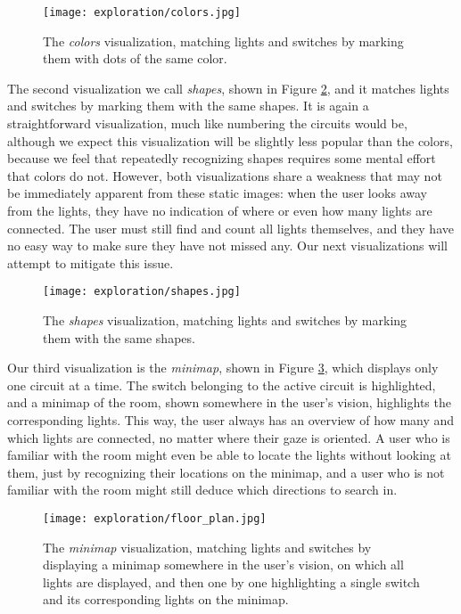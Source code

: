 \begin{figure}
    \centering
    \texttt{[image: exploration/colors.jpg]}
    \caption{The \textit{colors} visualization, matching lights and switches by marking them with dots of the same color.}
    \label{fig:explor:colors_vis}
\end{figure}

The second visualization we call \textit{shapes}, shown in Figure \ref{fig:explor:shapes_vis}, and it matches lights and switches by marking them with the same shapes. It is again a straightforward visualization, much like numbering the circuits would be, although we expect this visualization will be slightly less popular than the colors, because we feel that repeatedly recognizing shapes requires some mental effort that colors do not. However, both visualizations share a weakness that may not be immediately apparent from these static images: when the user looks away from the lights, they have no indication of where or even how many lights are connected. The user must still find and count all lights themselves, and they have no easy way to make sure they have not missed any. Our next visualizations will attempt to mitigate this issue.

\begin{figure}
    \centering
    \texttt{[image: exploration/shapes.jpg]}
    \caption{The \textit{shapes} visualization, matching lights and switches by marking them with the same shapes.}
    \label{fig:explor:shapes_vis}
\end{figure}

Our third visualization is the \textit{minimap}, shown in Figure \ref{fig:explor:floor_plan_vis}, which displays only one circuit at a time. The switch belonging to the active circuit is highlighted, and a minimap of the room, shown somewhere in the user's vision, highlights the corresponding lights. This way, the user always has an overview of how many and which lights are connected, no matter where their gaze is oriented. A user who is familiar with the room might even be able to locate the lights without looking at them, just by recognizing their locations on the minimap, and a user who is not familiar with the room might still deduce which directions to search in.

\begin{figure}
    \centering
    \texttt{[image: exploration/floor\_plan.jpg]}
    \caption{The \textit{minimap} visualization, matching lights and switches by displaying a minimap somewhere in the user's vision, on which all lights are displayed, and then one by one highlighting a single switch and its corresponding lights on the minimap.}
    \label{fig:explor:floor_plan_vis}
\end{figure}

